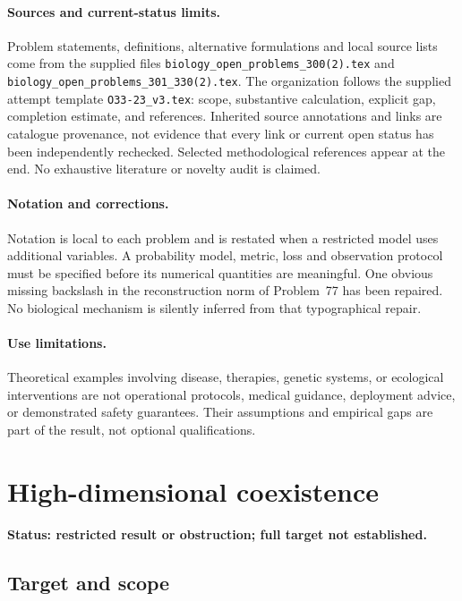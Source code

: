 \documentclass[11pt]{article}
\begin{document}
\paragraph{Sources and current-status limits.}
Problem statements, definitions, alternative formulations and local source lists
come from the supplied files
\texttt{biology\_open\_problems\_300(2).tex} and
\texttt{biology\_open\_problems\_301\_330(2).tex}.
The organization follows the supplied attempt template
\texttt{O33-23\_v3.tex}: scope, substantive calculation, explicit gap,
completion estimate, and references. Inherited source annotations and links are
catalogue provenance, not evidence that every link or current open status has
been independently rechecked. Selected methodological references appear at the
end. No exhaustive literature or novelty audit is claimed.

\paragraph{Notation and corrections.}
Notation is local to each problem and is restated when a restricted model uses
additional variables. A probability model, metric, loss and observation protocol
must be specified before its numerical quantities are meaningful. One obvious
missing backslash in the reconstruction norm of Problem~77 has been repaired.
No biological mechanism is silently inferred from that typographical repair.

\paragraph{Use limitations.}
Theoretical examples involving disease, therapies, genetic systems, or ecological
interventions are not operational protocols, medical guidance, deployment advice,
or demonstrated safety guarantees. Their assumptions and empirical gaps are part
of the result, not optional qualifications.


\section*{High-dimensional coexistence}
\label{prob:191}
\noindent\textbf{Status: restricted result or obstruction; full target not established.}
\subsection{Target and scope}
\end{document}
